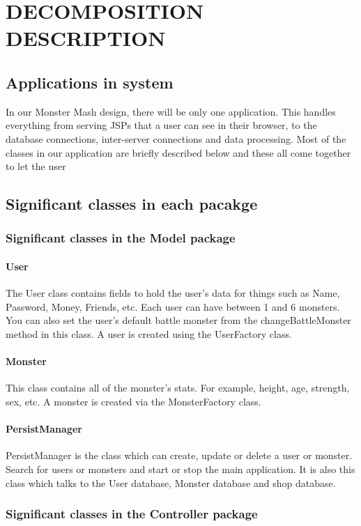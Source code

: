 \section{DECOMPOSITION DESCRIPTION}
\subsection{Applications in system}
In our Monster Mash design, there will be only one application. This handles everything from serving JSPs that a user can see in their browser, to the database connections, inter-server connections and data processing.
Most of the classes in our application are briefly described below and these all come together to let the user 

\subsection{Significant classes in each pacakge}
\subsubsection{Significant classes in the Model package}
	\paragraph{User}
	The User class contains fields to hold the user's data for things such as Name, Password, Money, Friends, etc. Each user can have between 1 and 6 monsters. You can also set the user's default battle monster from the changeBattleMonster method in this class. A user is created using the UserFactory class.
	\paragraph{Monster}
	This class contains all of the monster's stats. For example, height, age, strength, sex, etc. A monster is created via the MonsterFactory class.
	\paragraph{PersistManager}
	PersistManager is the class which can create, update or delete a user or monster. Search for users or monsters and start or stop the main application. It is also this class which talks to the User database, Monster database and shop database.
\subsubsection{Significant classes in the Controller package}
